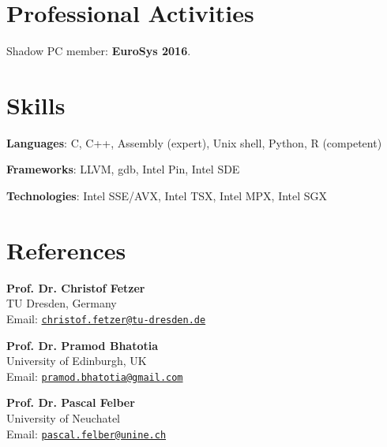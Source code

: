 \documentclass[letterpaper]{article}
\renewenvironment{itemize}{
  \begin{list}{}{
    \setlength{\leftmargin}{1.5em}
  }
}{
  \end{list}
}
\begin{document}
\section*{Professional Activities}


\begin{itemize}
 \item { Shadow PC member:} {\bf EuroSys 2016}.
\end{itemize}
  

\section*{Skills}
\begin{itemize}
	\item {\bf Languages}: C, C++, Assembly (expert), Unix shell, Python, R (competent)
	\item {\bf Frameworks}: LLVM, gdb, Intel Pin, Intel SDE
	\item {\bf Technologies}: Intel SSE/AVX, Intel TSX, Intel MPX, Intel SGX
\end{itemize}


\section*{References}

\begin{itemize}

\item {\bf Prof. Dr. Christof Fetzer }  \\
TU Dresden, Germany\\
Email: \href{mailto:christof.fetzer@tu-dresden.de}{\tt christof.fetzer@tu-dresden.de}
      
\item {\bf  Prof. Dr. Pramod Bhatotia }  \\
University of Edinburgh, UK\\
Email: \href{mailto:pramod.bhatotia@gmail.com}{\tt pramod.bhatotia@gmail.com}

\item {\bf Prof. Dr. Pascal Felber} \\
University of Neuchatel\\
Email: \href{mailto:pascal.felber@unine.ch}{\tt pascal.felber@unine.ch}

\end{itemize}
\end{document}
